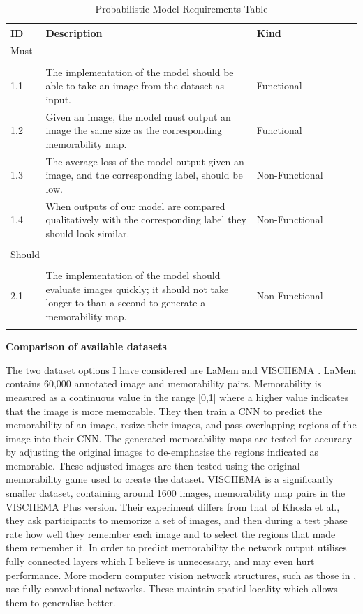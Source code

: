 \documentclass{UoYCSproject}
\begin{document}
\begin{table}[ht]
    \begin{tabular}{p{0.1\linewidth} p{0.6\linewidth} p{0.3\linewidth}}
    \toprule
    ID  & Description & Kind \\ \midrule
    \multicolumn{3}{l}{{Must}} \\
    \hline \\
    1.1 & The implementation of the model should be able to take an image from the dataset as input. & Functional \\
    1.2 & Given an image, the model must output an image the same size as the corresponding memorability map. & Functional \\
    1.3 & The average loss of the model output given an image, and the corresponding label, should be low. & Non-Functional \\
    1.4 & When outputs of our model are compared qualitatively with the corresponding label they should look similar. & Non-Functional \\
    \hline \\
    \multicolumn{3}{l}{{Should}} \\
    \hline \\
    2.1 & The implementation of the model should evaluate images quickly; it should not take longer to than a second to generate a memorability map. & Non-Functional \\
     &  &  \\ \bottomrule
    \end{tabular}
    \caption{Probabilistic Model Requirements Table}
    \label{tab:RequirementCaptureTable}
\end{table}

\textbf{Comparison of available datasets}

The two dataset options I have considered are LaMem \cite{ICCV15_Khosla} and VISCHEMA \cite{VischemaPaper}. 
LaMem contains 60,000 annotated image and memorability pairs. Memorability is measured as a continuous value in the range [0,1] where a higher value indicates that the image is more memorable. They then train a CNN to predict the memorability of an image, resize their images, and pass overlapping regions of the image into their CNN. The generated memorability maps are tested for accuracy by adjusting the original images to de-emphasise the regions indicated as memorable. These adjusted images are then tested using the original memorability game used to create the dataset.
VISCHEMA is a significantly smaller dataset, containing around 1600 images, memorability map pairs in the VISCHEMA Plus version. Their experiment differs from that of Khosla et al., they ask participants to memorize a set of images, and then during a test phase rate how well they remember each image and to select the regions that made them remember it. In order to predict memorability the network output utilises fully connected layers which I believe is unnecessary, and may even hurt performance. More modern computer vision network structures, such as those in \cite{ronneberger2015unet, goodfellow2014generative, ho2020denoising, isola2018imagetoimage, saharia2022palette}, use fully convolutional networks. These maintain spatial locality which allows them to generalise better.
\end{document}
